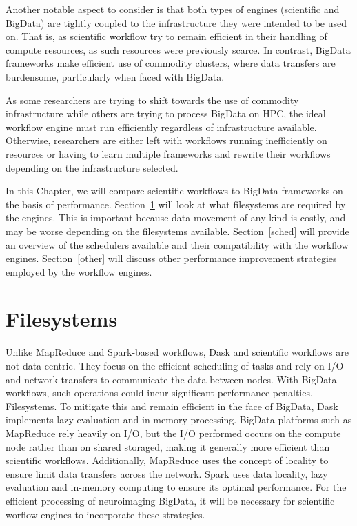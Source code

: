 \documentclass{report}
\begin{document}
        Another notable aspect to consider is that both types of engines 
        (scientific and BigData) are tightly coupled to the infrastructure
        they were intended to be used on. That is, as scientific workflow 
        try to remain efficient in their handling of compute resources, as such
        resources were previously scarce. In contrast, BigData frameworks 
        make efficient use of commodity clusters, where data transfers are 
        burdensome, particularly when faced with BigData.

        As some researchers are trying to shift towards the use of commodity 
        infrastructure while others are trying to process BigData on HPC, the 
        ideal workflow engine must run efficiently regardless of 
        infrastructure available. Otherwise, researchers are either left with
        workflows running inefficiently on resources or having to learn 
        multiple frameworks and rewrite their workflows depending on the 
        infrastructure selected.
 
        In this Chapter, we will compare scientific
        workflows to BigData frameworks on the basis of performance. 
        Section~\ref{fs} will look at what filesystems are required by the 
        engines. This is important because data movement of any kind is costly,
        and may be worse depending on the filesystems available. 
        Section~\ref{sched} will provide an overview of the schedulers 
        available and their compatibility with the workflow engines. 
        Section~\ref{other} will discuss other performance improvement 
        strategies employed by the workflow engines.
 
        \section{Filesystems}\label{fs}
            
            
            Unlike MapReduce and Spark-based workflows, Dask and scientific 
            workflows are not data-centric. They focus on the efficient 
            scheduling of tasks and rely on I/O and network transfers to
            communicate the data between nodes. With BigData workflows, such
            operations could incur significant performance penalties. 
            Filesystems. To mitigate this and remain efficient in the face of
            BigData, Dask implements lazy evaluation and in-memory processing.
            BigData platforms such as MapReduce rely heavily on I/O, but the 
            I/O performed occurs on the compute node rather than on 
            shared storaged, making it generally more efficient than scientific
            workflows. Additionally, MapReduce uses the concept of 
            locality to ensure limit data transfers across the network. Spark
            uses data locality, lazy evaluation and in-memory computing to 
            ensure its optimal performance.
            For the efficient processing of neuroimaging BigData, it will be
            necessary for scientific worflow engines to incorporate these 
            strategies.
        
\end{document}
